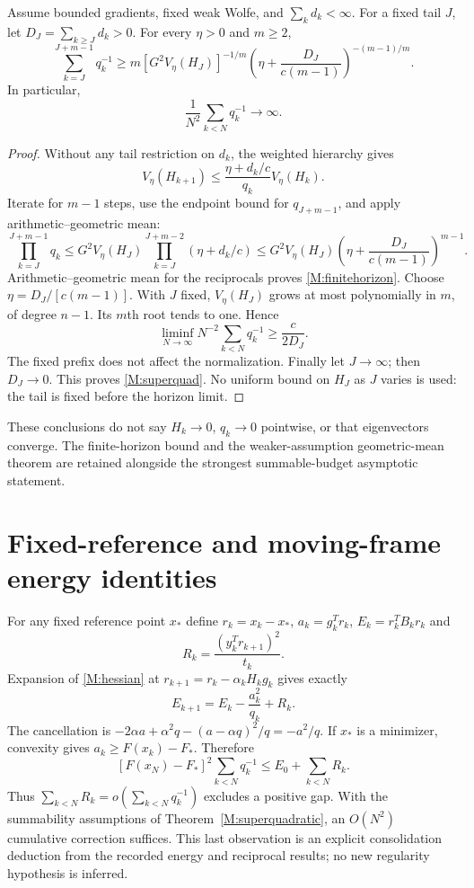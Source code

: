 \begin{theorem}\label{M:superquadratic}
Assume bounded gradients, fixed weak Wolfe, and $\sum_kd_k<\infty$. For a fixed tail $J$, let $D_J=\sum_{k\ge J}d_k>0$. For every $\eta>0$ and $m\ge2$,
\begin{equation}\label{M:finitehorizon}
 \sum_{k=J}^{J+m-1}q_k^{-1}\ge
 m[G^2V_\eta(H_J)]^{-1/m}
 \left(\eta+\frac{D_J}{c(m-1)}\right)^{-(m-1)/m}.
\end{equation}
In particular,
\begin{equation}\label{M:superquad}
 \frac1{N^2}\sum_{k<N}q_k^{-1}\longrightarrow\infty.
\end{equation}
\end{theorem}
\begin{proof}
Without any tail restriction on $d_k$, the weighted hierarchy gives
\[
 V_\eta(H_{k+1})\le\frac{\eta+d_k/c}{q_k}V_\eta(H_k).
\]
Iterate for $m-1$ steps, use the endpoint bound for $q_{J+m-1}$, and apply arithmetic--geometric mean:
\[
 \prod_{k=J}^{J+m-1}q_k
 \le G^2V_\eta(H_J)\prod_{k=J}^{J+m-2}(\eta+d_k/c)
 \le G^2V_\eta(H_J)\left(\eta+\frac{D_J}{c(m-1)}\right)^{m-1}.
\]
Arithmetic--geometric mean for the reciprocals proves \eqref{M:finitehorizon}. Choose $\eta=D_J/[c(m-1)]$. With $J$ fixed, $V_\eta(H_J)$ grows at most polynomially in $m$, of degree $n-1$. Its $m$th root tends to one. Hence
\[
 \liminf_{N\to\infty}N^{-2}\sum_{k<N}q_k^{-1}\ge \frac{c}{2D_J}.
\]
The fixed prefix does not affect the normalization. Finally let $J\to\infty$; then $D_J\to0$. This proves \eqref{M:superquad}. No uniform bound on $H_J$ as $J$ varies is used: the tail is fixed before the horizon limit.
\end{proof}
These conclusions do not say $H_k\to0$, $q_k\to0$ pointwise, or that eigenvectors converge. The finite-horizon bound and the weaker-assumption geometric-mean theorem are retained alongside the strongest summable-budget asymptotic statement.

\section{Fixed-reference and moving-frame energy identities}
\label{M:energy}
For any fixed reference point $x_*$ define $r_k=x_k-x_*$, $a_k=g_k^Tr_k$, $E_k=r_k^TB_kr_k$ and
\[
 R_k=\frac{(y_k^Tr_{k+1})^2}{t_k}.
\]
Expansion of \eqref{M:hessian} at $r_{k+1}=r_k-\alpha_kH_kg_k$ gives exactly
\begin{equation}\label{M:fixedenergy}
 E_{k+1}=E_k-\frac{a_k^2}{q_k}+R_k.
\end{equation}
The cancellation is $-2\alpha a+\alpha^2q-(a-\alpha q)^2/q=-a^2/q$. If $x_*$ is a minimizer, convexity gives $a_k\ge F(x_k)-F_*$. Therefore
\begin{equation}\label{M:energybound}
 [F(x_N)-F_*]^2\sum_{k<N}q_k^{-1}\le E_0+\sum_{k<N}R_k.
\end{equation}
Thus $\sum_{k<N}R_k=o(\sum_{k<N}q_k^{-1})$ excludes a positive gap. With the summability assumptions of Theorem~\ref{M:superquadratic}, an $O(N^2)$ cumulative correction suffices. This last observation is an explicit consolidation deduction from the recorded energy and reciprocal results; no new regularity hypothesis is inferred.

